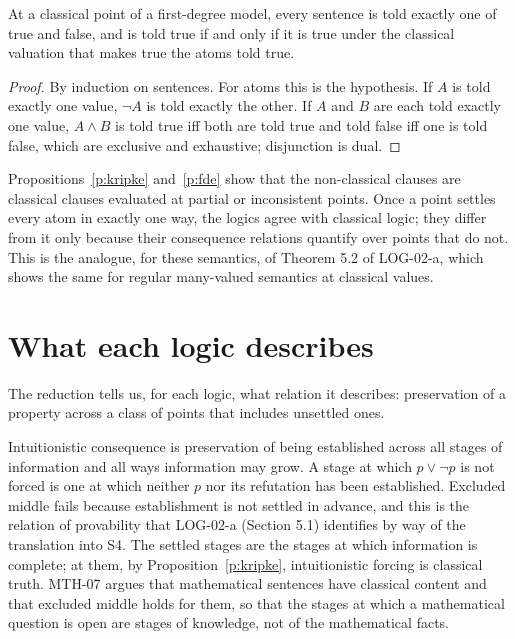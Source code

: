 \documentclass{situationist-preprint}
\begin{document}
\begin{proposition}\label{p:fde}
At a classical point of a first-degree model, every sentence is told exactly one of true and false, and is told true if and only if it is true under the classical valuation that makes true the atoms told true.
\end{proposition}

\begin{proof}
By induction on sentences. For atoms this is the hypothesis. If $A$ is told exactly one value, $\neg A$ is told exactly the other. If $A$ and $B$ are each told exactly one value, $A \wedge B$ is told true iff both are told true and told false iff one is told false, which are exclusive and exhaustive; disjunction is dual.
\end{proof}

Propositions~\ref{p:kripke} and~\ref{p:fde} show that the non-classical clauses are classical clauses evaluated at partial or inconsistent points. Once a point settles every atom in exactly one way, the logics agree with classical logic; they differ from it only because their consequence relations quantify over points that do not. This is the analogue, for these semantics, of Theorem 5.2 of LOG-02-a, which shows the same for regular many-valued semantics at classical values.

\section{What each logic describes}

The reduction tells us, for each logic, what relation it describes: preservation of a property across a class of points that includes unsettled ones.

Intuitionistic consequence is preservation of being established across all stages of information and all ways information may grow. A stage at which $p \vee \neg p$ is not forced is one at which neither $p$ nor its refutation has been established. Excluded middle fails because establishment is not settled in advance, and this is the relation of provability that LOG-02-a (Section 5.1) identifies by way of the translation into S4. The settled stages are the stages at which information is complete; at them, by Proposition~\ref{p:kripke}, intuitionistic forcing is classical truth. MTH-07 argues that mathematical sentences have classical content and that excluded middle holds for them, so that the stages at which a mathematical question is open are stages of knowledge, not of the mathematical facts.
\end{document}
